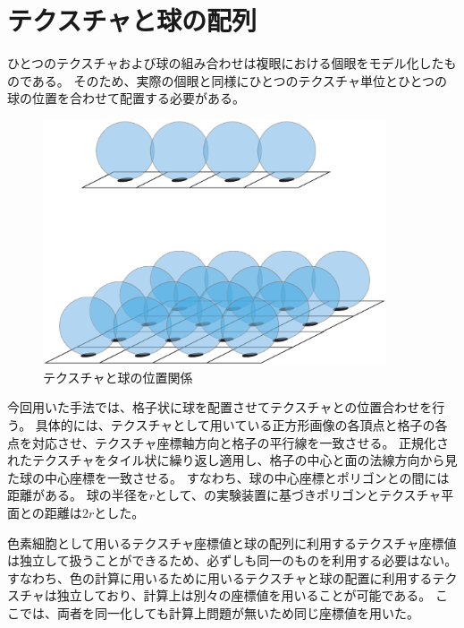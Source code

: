 \section{テクスチャと球の配列}
\label{STextureandsphere}

ひとつのテクスチャおよび球の組み合わせは複眼における個眼をモデル化したものである。
そのため、実際の個眼と同様にひとつのテクスチャ単位とひとつの球の位置を合わせて配置する必要がある。

\begin{figure}[h]
  \centering
  \includegraphics[width=4.0in]{./img/tex_sphere_pos.eps}
  \caption{テクスチャと球の位置関係}
  \label{FTexturesphereposition}
\end{figure}

\noindent
今回用いた手法では、格子状に球を配置させてテクスチャとの位置合わせを行う。
具体的には、テクスチャとして用いている正方形画像の各頂点と格子の各点を対応させ、テクスチャ座標軸方向と格子の平行線を一致させる。
正規化されたテクスチャをタイル状に繰り返し適用し、格子の中心と面の法線方向から見た球の中心座標を一致させる。
すなわち、球の中心座標とポリゴンとの間には距離がある。
球の半径を$r$として、の実験装置に基づきポリゴンとテクスチャ平面との距離は$2r$とした。

色素細胞として用いるテクスチャ座標値と球の配列に利用するテクスチャ座標値は独立して扱うことができるため、必ずしも同一のものを利用する必要はない。
すなわち、色の計算に用いるために用いるテクスチャと球の配置に利用するテクスチャは独立しており、計算上は別々の座標値を用いることが可能である。
ここでは、両者を同一化しても計算上問題が無いため同じ座標値を用いた。

